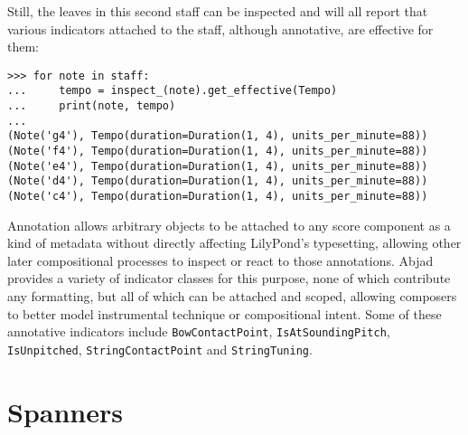 \noindent Still, the leaves in this second staff can be inspected and will all
report that various indicators attached to the staff, although annotative, are
effective for them:

\begin{comment}
<abjad>
for note in staff:
    tempo = inspect_(note).get_effective(Tempo)
    print(note, tempo)

</abjad>
\end{comment}

\begin{abjadbookoutput}
\begin{singlespacing}
\vspace{-0.5\baselineskip}
\begin{verbatim}
>>> for note in staff:
...     tempo = inspect_(note).get_effective(Tempo)
...     print(note, tempo)
...
(Note('g4'), Tempo(duration=Duration(1, 4), units_per_minute=88))
(Note('f4'), Tempo(duration=Duration(1, 4), units_per_minute=88))
(Note('e4'), Tempo(duration=Duration(1, 4), units_per_minute=88))
(Note('d4'), Tempo(duration=Duration(1, 4), units_per_minute=88))
(Note('c4'), Tempo(duration=Duration(1, 4), units_per_minute=88))
\end{verbatim}
\end{singlespacing}
\end{abjadbookoutput}

\noindent Annotation allows arbitrary objects to be attached to any score
component as a kind of metadata without directly affecting LilyPond's
typesetting, allowing other later compositional processes to inspect or react
to those annotations. Abjad provides a variety of indicator classes for this
purpose, none of which contribute any formatting, but all of which can be
attached and scoped, allowing composers to better model instrumental technique
or compositional intent. Some of these annotative indicators include
\texttt{BowContactPoint}, \texttt{IsAtSoundingPitch}, \texttt{IsUnpitched},
\texttt{StringContactPoint} and \texttt{StringTuning}.

\section{Spanners}
\label{sec:spanners}


